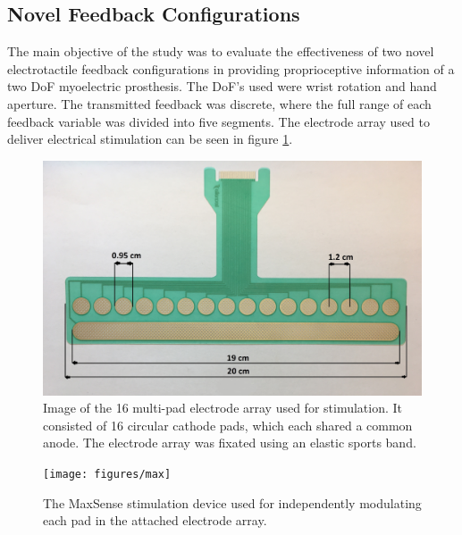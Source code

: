 \subsection{Novel Feedback Configurations}
The main objective of the study was to evaluate the effectiveness of two novel electrotactile feedback configurations in providing proprioceptive information of a two DoF myoelectric prosthesis. 
The DoF's used were wrist rotation and hand aperture. The transmitted feedback was discrete, where the full range of each feedback variable was divided into five segments. The electrode array used to deliver electrical stimulation can be seen in figure \ref{fig:pa:electrode}.
\begin{figure}[H]                 
	\includegraphics[width=1\textwidth]{figures/electrode}  
	\caption{Image of the 16 multi-pad electrode array used for stimulation. It consisted of 16 circular cathode pads, which each shared a common anode. The electrode array was fixated using an elastic sports band.}
	\label{fig:pa:electrode} 
\end{figure}
\begin{figure}[h]                 
	\texttt{[image: figures/max]}  
	\caption{The MaxSense stimulation device used for independently modulating each pad in the attached electrode array.}
	\label{fig:pa:max} 
\end{figure}   

